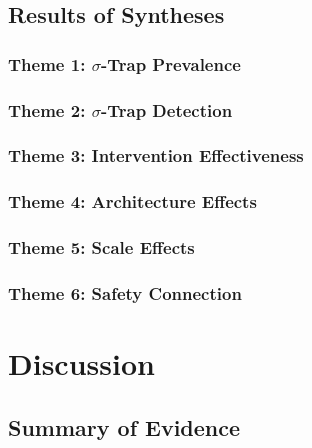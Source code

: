 
\subsection{Results of Syntheses}\label{sec:synthesis-results}


\subsubsection{Theme 1: $\sigma$-Trap Prevalence}
\subsubsection{Theme 2: $\sigma$-Trap Detection}
\subsubsection{Theme 3: Intervention Effectiveness}
\subsubsection{Theme 4: Architecture Effects}
\subsubsection{Theme 5: Scale Effects}
\subsubsection{Theme 6: Safety Connection}

\section{Discussion}\label{sec:discussion}


\subsection{Summary of Evidence}\label{sec:summary}

